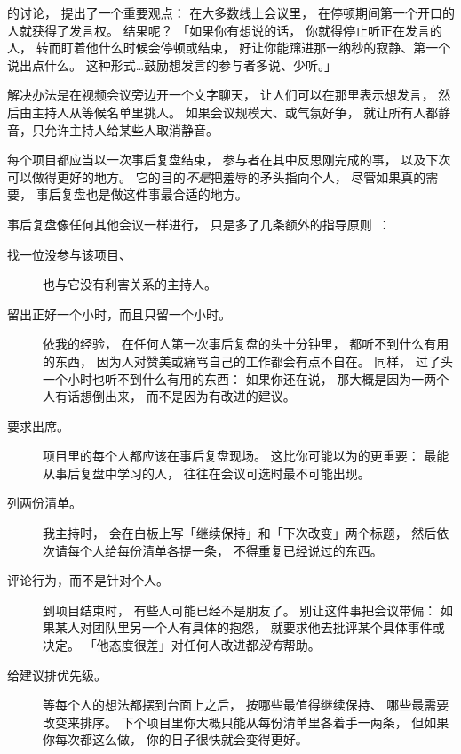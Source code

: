 的讨论，
提出了一个重要观点：
在大多数线上会议里，
在停顿期间第一个开口的人就获得了发言权。
结果呢？
「如果你有想说的话，
你就得停止听正在发言的人，
转而盯着他什么时候会停顿或结束，
好让你能蹿进那一纳秒的寂静、第一个说出点什么。
这种形式{\ldots}鼓励想发言的参与者多说、少听。」

解决办法是在视频会议旁边开一个文字聊天，
让人们可以在那里表示想发言，
然后由主持人从等候名单里挑人。
如果会议规模大、或气氛好争，
就让所有人都静音，只允许主持人给某些人取消静音。


每个项目都应当以一次事后复盘结束，
参与者在其中反思刚完成的事，
以及下次可以做得更好的地方。
它的目的\emph{不是}把羞辱的矛头指向个人，
尽管如果真的需要，
事后复盘也是做这件事最合适的地方。

事后复盘像任何其他会议一样进行，
只是多了几条额外的指导原则~\cite{Derb2006}：

\begin{description}

\item[找一位没参与该项目、]
  也与它没有利害关系的主持人。

\item[留出正好一个小时，而且只留一个小时。]
  依我的经验，
  在任何人第一次事后复盘的头十分钟里，
  都听不到什么有用的东西，
  因为人对赞美或痛骂自己的工作都会有点不自在。
  同样，
  过了头一个小时也听不到什么有用的东西：
  如果你还在说，
  那大概是因为一两个人有话想倒出来，
  而不是因为有改进的建议。

\item[要求出席。]
  项目里的每个人都应该在事后复盘现场。
  这比你可能以为的更重要：
  最能从事后复盘中学习的人，
  往往在会议可选时最不可能出现。

\item[列两份清单。]
  我主持时，
  会在白板上写「继续保持」和「下次改变」两个标题，
  然后依次请每个人给每份清单各提一条，
  不得重复已经说过的东西。

\item[评论行为，而不是针对个人。]
  到项目结束时，
  有些人可能已经不是朋友了。
  别让这件事把会议带偏：
  如果某人对团队里另一个人有具体的抱怨，
  就要求他去批评某个具体事件或决定。
  「他态度很差」对任何人改进都\emph{没有}帮助。

\item[给建议排优先级。]
  等每个人的想法都摆到台面上之后，
  按哪些最值得继续保持、
  哪些最需要改变来排序。
  下个项目里你大概只能从每份清单里各着手一两条，
  但如果你每次都这么做，
  你的日子很快就会变得更好。

\end{description}
